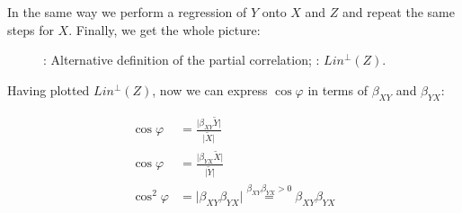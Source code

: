 In the same way we perform a regression of $Y$ onto $X$ and $Z$ and repeat the
same steps for $X$. Finally, we get the whole picture:

\begin{figure}[ht!]
\begin{center}
\caption{: Alternative definition of the partial correlation;
: $Lin^{\perp}(Z)$.}
\end{center}
\end{figure}

Having plotted $Lin^{\perp}(Z)$, now we can express $\cos \varphi$ in terms of $\beta_{XY}$
and $\beta_{YX}$:

\begin{equation*}%
\begin{split}
\cos \varphi &= \frac{\vert \beta_{XY} \widetilde Y \vert}{\vert \widetilde X \vert} \\
\cos \varphi &= \frac{\vert \beta_{YX} \widetilde X \vert}{\vert \widetilde Y \vert} \\
\cos^2 \varphi &= \vert \beta_{XY} \beta_{YX} \vert \stackrel{\beta_{XY} \beta_{YX} > 0}{=} \beta_{XY} \beta_{YX}
\end{split}
\end{equation*}

